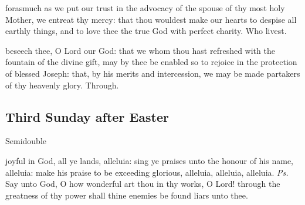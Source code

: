 \vspace{-0.15\baselineskip}

\secret

\vspace{-0.1\baselineskip}

 forasmuch as we put our trust in the advocacy of the spouse of thy most holy Mother, we entreat thy mercy: that thou wouldest make our hearts to despise all earthly things, and to love thee the true God with perfect charity. Who livest.

\vspace{-0.15\baselineskip}

\postcommunion

\vspace{-0.1\baselineskip}

 beseech thee, O Lord our God: that we whom thou hast refreshed with the fountain of the divine gift, may by thee be enabled so to rejoice in the protection of blessed Joseph: that, by his merits and intercession, we may be made partakers of thy heavenly glory. Through.


\subsection{Third Sunday after Easter}
\begin{inhead}
    {Semidouble}
\end{inhead}


\vspace{-0.15\baselineskip}

\introit

\vspace{-0.1\baselineskip}

 joyful in God, all ye lands, alleluia: sing ye praises unto the honour of his name, alleluia: make his praise to be exceeding glorious, alleluia, alleluia, alleluia. \textit{Ps.} Say unto God, O how wonderful art thou in thy works, O Lord! through the greatness of thy power shall thine enemies be found liars unto thee.

\vspace{-0.15\baselineskip}

